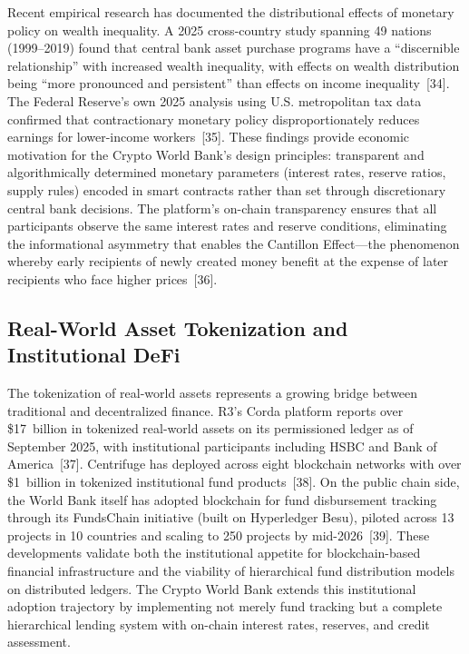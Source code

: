 \documentclass[12pt,a4paper]{report}
\begin{document}
Recent empirical research has documented the distributional effects of monetary policy on wealth inequality. A 2025 cross-country study spanning 49 nations (1999--2019) found that central bank asset purchase programs have a ``discernible relationship'' with increased wealth inequality, with effects on wealth distribution being ``more pronounced and persistent'' than effects on income inequality~[34]. The Federal Reserve's own 2025 analysis using U.S. metropolitan tax data confirmed that contractionary monetary policy disproportionately reduces earnings for lower-income workers~[35]. These findings provide economic motivation for the Crypto World Bank's design principles: transparent and algorithmically determined monetary parameters (interest rates, reserve ratios, supply rules) encoded in smart contracts rather than set through discretionary central bank decisions. The platform's on-chain transparency ensures that all participants observe the same interest rates and reserve conditions, eliminating the informational asymmetry that enables the Cantillon Effect---the phenomenon whereby early recipients of newly created money benefit at the expense of later recipients who face higher prices~[36].

\subsection{Real-World Asset Tokenization and Institutional DeFi}

The tokenization of real-world assets represents a growing bridge between traditional and decentralized finance. R3's Corda platform reports over \$17~billion in tokenized real-world assets on its permissioned ledger as of September 2025, with institutional participants including HSBC and Bank of America~[37]. Centrifuge has deployed across eight blockchain networks with over \$1~billion in tokenized institutional fund products~[38]. On the public chain side, the World Bank itself has adopted blockchain for fund disbursement tracking through its FundsChain initiative (built on Hyperledger Besu), piloted across 13 projects in 10 countries and scaling to 250 projects by mid-2026~[39]. These developments validate both the institutional appetite for blockchain-based financial infrastructure and the viability of hierarchical fund distribution models on distributed ledgers. The Crypto World Bank extends this institutional adoption trajectory by implementing not merely fund tracking but a complete hierarchical lending system with on-chain interest rates, reserves, and credit assessment.
\end{document}
